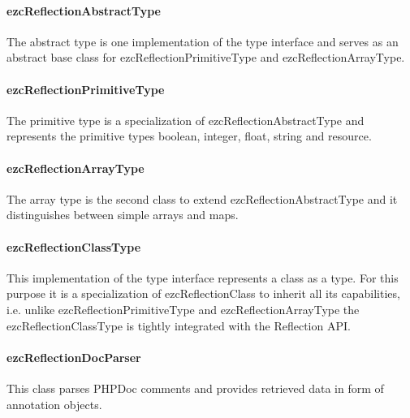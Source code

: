\documentclass[10pt,final,a4paper,oneside]{article}
\begin{document}
\paragraph{ezcReflectionAbstractType}
The abstract type is one implementation of the type interface
and serves as an abstract base class
for ezcReflectionPrimitiveType and
ezcReflectionArrayType.

\paragraph{ezcReflectionPrimitiveType}
The primitive type is a specialization 
of ezcReflectionAbstractType
and represents the primitive types
boolean, integer, float, string and resource.

\paragraph{ezcReflectionArrayType}
The array type is the second class
to extend ezcReflectionAbstractType
and it distinguishes
between simple arrays and maps.

\paragraph{ezcReflectionClassType}
This implementation of the type interface
represents a class as a type.
For this purpose it is a specialization of ezcReflectionClass
to inherit all its capabilities,
i.e. unlike ezcReflectionPrimitiveType and ezcReflectionArrayType
the ezcReflectionClassType is tightly integrated with the Reflection API.


\paragraph{ezcReflectionDocParser}
This class parses PHPDoc comments
and provides retrieved data
in form of annotation objects.
\end{document}
